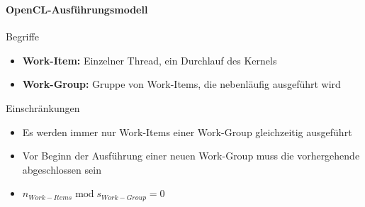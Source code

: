 \documentclass{beamer}
\begin{document}
\begin{frame}
\begin{figure}
\begin{center}
{
			}
			\label{fig:platform_example}
		\end{center}	
	\end{figure}
\end{frame}

\begin{frame}
	\frametitle{}
	\framesubtitle{OpenCL-Ausführungsmodell}
	\begin{block}{Begriffe}
		\begin{itemize}
			\item \textbf{Work-Item:} Einzelner Thread, ein Durchlauf des Kernels
			\item \textbf{Work-Group:} Gruppe von Work-Items, die nebenläufig ausgeführt wird
		\end{itemize}
	\end{block}
	\begin{block}{Einschränkungen}
		\begin{itemize}
			\item Es werden immer nur Work-Items einer Work-Group gleichzeitig ausgeführt
			\item Vor Beginn der Ausführung einer neuen Work-Group muss die vorhergehende abgeschlossen sein
			\item $n_{Work-Items} \operatorname{mod} s_{Work-Group} = 0$
		\end{itemize}
	\end{block}
\end{frame}
\end{document}
